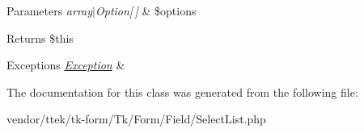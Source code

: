 \begin{DoxyParams}{Parameters}
{\em array$\vert$\+Option\mbox{[}$\,$\mbox{]}} & \$options \\
\hline
\end{DoxyParams}
\begin{DoxyReturn}{Returns}
\$this 
\end{DoxyReturn}

\begin{DoxyExceptions}{Exceptions}
{\em \hyperlink{classTk_1_1Form_1_1Exception}{Exception}} & \\
\hline
\end{DoxyExceptions}


The documentation for this class was generated from the following file\+:\begin{DoxyCompactItemize}
\item 
vendor/ttek/tk-\/form/\+Tk/\+Form/\+Field/Select\+List.\+php\end{DoxyCompactItemize}
